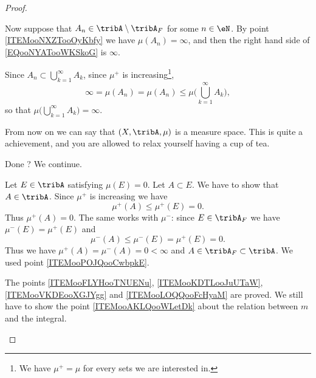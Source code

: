\begin{proof}
\begin{subproof}
\begin{subproof}
			Now suppose that \( A_n\in\tribA\setminus\tribA_F\) for some \( n\in \eN\). By point \ref{ITEMooNXZTooOyKbfy} we have \( \mu(A_n)=\infty\), and then the right hand side of \eqref{EQooNYATooWKSkoG} is \( \infty\).

			Since \( A_n\subset\bigcup_{k=1}^{\infty}A_k\), since \( \mu^+\) is increasing\footnote{We have \( \mu^+=\mu\) for every sets we are interested in.},
			\begin{equation}
				\infty=\mu(A_n) =\mu(A_n) \leq \mu\big( \bigcup_{k=1}^{\infty}A_k \big),
			\end{equation}
			so that \( \mu\big( \bigcup_{k=1}^{\infty}A_k \big)=\infty\).
		\end{subproof}

		From now on we can say that \( (X,\tribA,\mu)\) is a measure space. This is quite a achievement, and you are allowed to relax yourself having a cup of tea.

		Done ? We continue.


		Let \( E\in\tribA\) satisfying \( \mu(E)=0\). Let \( A\subset E\). We have to show that \( A\in\tribA\). Since \( \mu^+\) is increasing we have
		\begin{equation}
			\mu^+(A)\leq \mu^+(E)=0.
		\end{equation}
		Thus \( \mu^+(A)=0\). The same works with \( \mu^-\): since \( E\in\tribA_F\) we have \( \mu^-(E)=\mu^+(E)\) and
		\begin{equation}
			\mu^-(A)\leq \mu^-(E)=\mu^+(E)=0.
		\end{equation}
		Thus we have \( \mu^+(A)=\mu^-(A)=0<\infty\) and \( A\in \tribA_F\subset\tribA\). We used point \ref{ITEMooPOJQooCwbpkE}.

		\spitem[Summary]

		The points \ref{ITEMooFLYHooTNUENu}, \ref{ITEMooKDTLooJuUTaW}, \ref{ITEMooVKDEooXGJYgg} and \ref{ITEMooLOQQooFcHyaM} are proved. We still have to show the point \ref{ITEMooAKLQooWLetDk} about the relation between \( m\) and the integral.



\end{subproof}
\end{proof}
